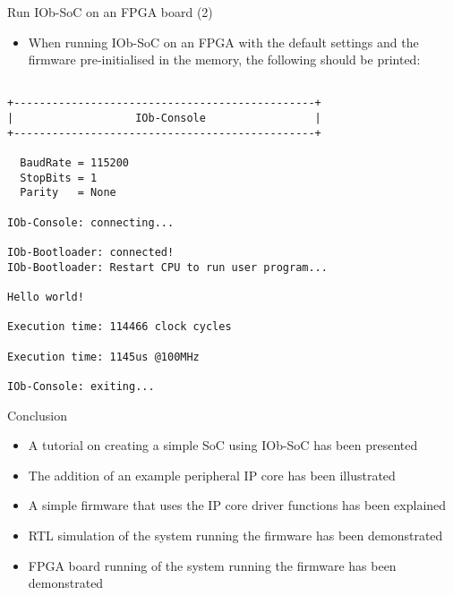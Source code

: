 \documentclass [xcolor=svgnames, t] {beamer}
\begin{document}
\begin{frame}[fragile]{Run IOb-SoC on an FPGA board (2)}
\begin{itemize}
\item When running IOb-SoC on an FPGA with the default settings and the firmware
  pre-initialised in the memory, the following should be printed:
\end{itemize}

\begin{tiny}
  \begin{lstlisting}

+-----------------------------------------------+
|                   IOb-Console                 |
+-----------------------------------------------+

  BaudRate = 115200
  StopBits = 1
  Parity   = None

IOb-Console: connecting...

IOb-Bootloader: connected!
IOb-Bootloader: Restart CPU to run user program...

Hello world!

Execution time: 114466 clock cycles

Execution time: 1145us @100MHz

IOb-Console: exiting...

  \end{lstlisting}
\end{tiny}
\end{frame}

\begin{frame}{Conclusion}
  \begin{itemize}
  \item A tutorial on creating a simple SoC using IOb-SoC has been presented
  \item The addition of an example peripheral IP core has been illustrated
  \item A simple firmware that uses the IP core driver functions has been explained
  \item RTL simulation of the system running the firmware has been demonstrated
  \item FPGA board running of the system running the firmware has been demonstrated
  \end{itemize}
\end{frame}

\end{document}
